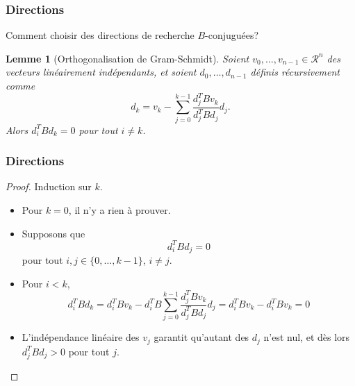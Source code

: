 \documentclass[usepdftitle=false,aspectratio=169]{beamer}
\newtheorem{lem}{Lemme}
\def\cR{\mathcal{R}}
\begin{document}




\begin{frame}
\frametitle{Directions}

Comment choisir des directions de recherche $B$-conjuguées?

\begin{lem}[Orthogonalisation de Gram-Schmidt]
Soient $v_0,\ldots, v_{n-1} \in \cR^n$ des vecteurs linéairement indépendants, et soient $d_0,\ldots, d_{n-1}$ définis récursivement comme
$$
d_k = v_k - \sum_{j = 0}^{k-1} \frac{d_j^TBv_k}{d_j^TBd_j}d_j.
$$
Alors $d_i^T B d_k = 0$ pour tout $i \ne k$.
\end{lem}

\end{frame}

\begin{frame}
\frametitle{Directions}

\begin{proof}
Induction sur $k$.
\begin{itemize}
\item
Pour $k = 0$, il n'y a rien à prouver.
\item
Supposons que
$$
d_i^T B d_j = 0
$$
pour tout $i, j \in \lbrace 0,\ldots, k - 1 \rbrace$, $i \ne j$.
\item
Pour $i < k$,
$$
d_i^T B d_k
= d_i^T B v_k - d_i^T B \sum_{j = 0}^{k-1} \frac{d_j^TBv_k}{d_j^TBd_j}d_j
= d_i^T B v_k - d_i^T B v_k
= 0
$$
\item
L'indépendance linéaire des $v_j$ garantit qu'autant des $d_j$ n'est nul, et dès lors $d_j^TBd_j > 0$ pour tout $j$.
\end{itemize}

\end{proof}

\end{frame}
\end{document}
